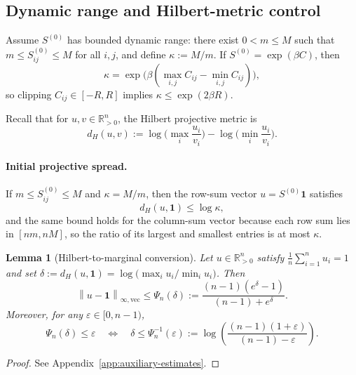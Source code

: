 \documentclass[10pt]{article}
\numberwithin{equation}{section}
\theoremstyle{plain}
\newtheorem{lemma}[theorem]{Lemma}
\theoremstyle{definition}
\theoremstyle{remark}
\newcommand{\R}{\mathbb{R}}
\newcommand{\ones}{\mathbf{1}}
\newcommand{\norm}[1]{\left\lVert #1 \right\rVert}
\begin{document}
\subsection{Dynamic range and Hilbert-metric control}\label{subsec:hilbert}
Assume $S^{(0)}$ has bounded dynamic range: there exist $0<m\le M$ such that
$m\le S^{(0)}_{ij}\le M$ for all $i,j$, and define $\kappa:=M/m$. If $S^{(0)}=\exp(\beta C)$, then
\begin{equation}
\kappa=\exp\!\big(\beta(\max_{i,j} C_{ij}-\min_{i,j} C_{ij})\big),
\end{equation}
so clipping $C_{ij}\in[-R,R]$ implies $\kappa\le \exp(2\beta R)$.

Recall that for $u,v\in\R^n_{>0}$, the Hilbert projective metric is
\begin{equation}
d_H(u,v):=\log\Big(\max_i \frac{u_i}{v_i}\Big)-\log\Big(\min_i \frac{u_i}{v_i}\Big).
\end{equation}

\paragraph{Initial projective spread.}
If \(m\le S^{(0)}_{ij}\le M\) and \(\kappa=M/m\), then the row-sum vector
\(u=S^{(0)}\ones\) satisfies
\[
        d_H(u,\ones)\le\log\kappa,
\]
and the same bound holds for the column-sum vector because each row sum lies in
\([nm,nM]\), so the ratio of its largest and smallest entries is at most
\(\kappa\).

\begin{lemma}[Hilbert-to-marginal conversion]\label{lem:Psi}
Let $u\in\R^n_{>0}$ satisfy $\frac{1}{n}\sum_{i=1}^n u_i=1$ and set
$\delta:=d_H(u,\ones)=\log\!\big(\max_i u_i/\min_i u_i\big)$. Then
\begin{equation}\label{eq:Psi}
\norm{u-\ones}_{\infty,\mathrm{vec}} \le \Psi_n(\delta)
:=\frac{(n-1)(e^\delta-1)}{(n-1)+e^\delta}.
\end{equation}
Moreover, for any $\varepsilon\in[0,n-1)$,
\begin{equation}\label{eq:Psi-inv}
\Psi_n(\delta)\le \varepsilon
\quad\Longleftrightarrow\quad
\delta\le \Psi_n^{-1}(\varepsilon)
:=\log\!\left(\frac{(n-1)(1+\varepsilon)}{(n-1)-\varepsilon}\right).
\end{equation}
\end{lemma}

\begin{proof}
See Appendix~\ref{app:auxiliary-estimates}.
\end{proof}
\end{document}
